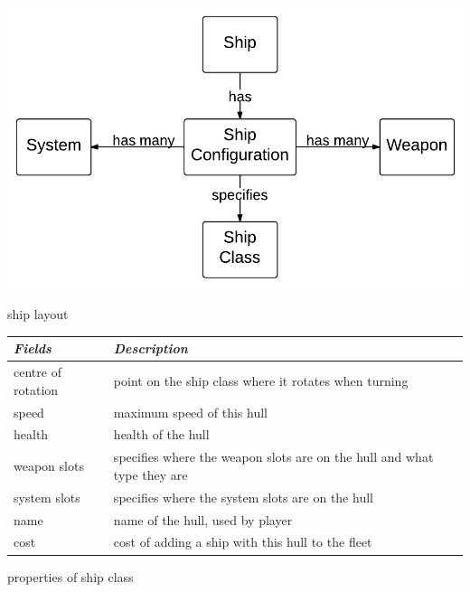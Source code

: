 \begin{marginfigure}
	\includegraphics{res/model/ship.pdf}
	\caption{ship layout}
	\label{fig:model:shipRelation}
\end{marginfigure}

\begin{margintable}
    \begin{tabular}{p{4em} p{11em}}
    \toprule
    \emph{Fields} & \emph{Description} \\
    \midrule
    centre of rotation & point on the ship class where it rotates when turning \\
    speed & maximum speed of this hull \\
    health & health of the hull \\
    weapon slots & specifies where the weapon slots are on the hull and what type they are \\
    system slots & specifies where the system slots are on the hull \\
    name & name of the hull, used by player \\
    cost & cost of adding a ship with this hull to the fleet \\
    \bottomrule
    \end{tabular}
    	\vspace{1em}
	\caption{properties of ship class}
	\label{tab:model:shipClassFields}
\end{margintable}




 


% 